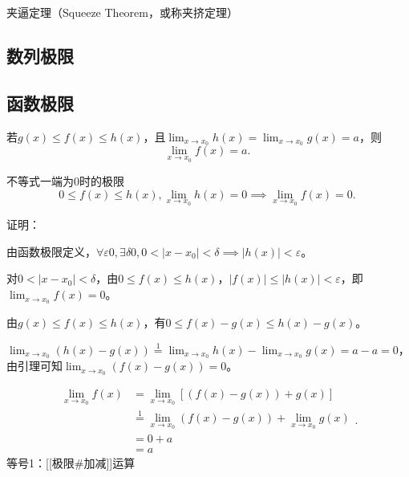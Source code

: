 
\begin{issues}
\issueDraft
\end{issues}
夹逼定理（Squeeze Theorem，或称夹挤定理）

\subsection{数列极限}

\subsection{函数极限}

若$g(x)\leq f(x)\leq h(x)$，且$\lim _{x\to x_0}h(x)=\lim _{x\to x_0}g(x)=a$，则
\begin{equation}
\lim _{x\to x_0}f(x)=a.~
\end{equation}

\begin{lemma}{不等式一端为0时的极限}
\begin{equation}
0\leq f(x)\leq h(x),\lim _{x\to x_0}h(x)=0\implies\lim _{x\to x_0}f(x)=0.~
\end{equation}

证明：

由函数极限定义，$\forall\varepsilon 0,\exists\delta 0,0<|x-x_0|<\delta\implies|h(x)|<\varepsilon$。
 
对$0<|x-x_0|<\delta$，由$0\leq f(x)\leq h(x)$，$|f(x)|\leq |h(x)|<\varepsilon$，即$\lim _{x\to x_0}f(x)=0$。

\end{lemma}

 由$g(x)\leq f(x)\leq h(x)$，有$0\leq f(x)-g(x)\leq h(x)-g(x)$。
 
 $\lim _{x\to x_0}(h(x)-g(x))\overset{\mathrm{1}}{=}\lim _{x\to x_0}h(x)-\lim _{x\to x_0}g(x)=a-a=0$，由引理可知$\lim _{x\to x_0}(f(x)-g(x))=0$。
 
 $$\begin{align*} \lim _{x\to x_0}f(x) &= \lim _{x\to x_0}[(f(x)-g(x))+g(x)] \\ 
 &\overset{\mathrm{1}}{=} \lim _{x\to x_0}(f(x)-g(x))+\lim _{x\to x_0}g(x) \\ 
 &= 0+a\\ 
 &=a \end{align*}.~$$
 等号1：[[极限#加减]]运算